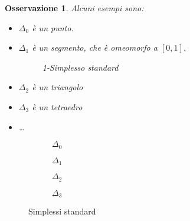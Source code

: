 \documentclass[10pt, twoside=false, x11names]{scrbook}
\newtheorem{osservation}[theorem]{Osservazione}
\begin{document}
\begin{osservation} Alcuni esempi sono:
  \begin{itemize}
  \item $ \Delta_0 $ è un punto.
  \item $ \Delta_1 $ è un segmento, che è omeomorfo a $ [0,1] $.
    \begin{figure}[htbp]
      \centering
      \caption{1-Simplesso standard}
      \label{fig:lez1:1_standard_simplex}
    \end{figure}
  \item $ \Delta_2 $ è un triangolo
  \item $ \Delta_3 $ è un tetraedro
  \item \dots
  \end{itemize}
\end{osservation}
\begin{figure}[htbp]
  \centering
  \begin{subfigure}{.2\textwidth}
    \centering
    \caption{$ \Delta_0 $}
  \end{subfigure}
  \begin{subfigure}{.2\textwidth}
    \centering
    \caption{$ \Delta_1 $}
  \end{subfigure}
  \begin{subfigure}{.2\textwidth}
    \centering
    \caption{$ \Delta_2 $}
  \end{subfigure}
  \begin{subfigure}{.33\textwidth}
    \centering
    \def\svgwidth{0.56\textwidth}
    
    \caption{$ \Delta_3 $}
  \end{subfigure}%
  \caption{Simplessi standard}
  \label{fig:lez1:standard_simplexes}
\end{figure}
\end{document}
